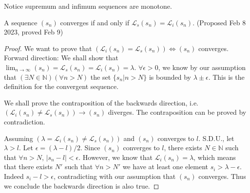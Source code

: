 \documentclass[../note.tex]{subfiles}
\begin{document}
\begin{remark}
	Notice supremum and infimum sequences are monotone.
\end{remark}

\begin{theorem} \label{analysis:th:Convergence_and_limit_of_sup_in}
	A sequence $(s_n)$ converges if and only if $\mathcal{L}_s (s_n) = \mathcal{L}_i(s_n)$. 
	(Proposed Feb 8 2023, proved Feb 9)
\end{theorem}

\begin{proof}
We want to prove that $(\mathcal{L}_i (s_n) = \mathcal{L}_s (s_n)) \iff (s_n)$ converges. \\
Forward direction: We shall show that $\lim_{n\to \infty}(s_n)=\mathcal{L}_s(s_n) = \mathcal{L}_i (s_n) = \lambda$. $\forall \epsilon >0$, we know by our assumption that $(\exists N \in \mathbb{N})(\forall n>N)$ the set $\{s_n|n>N\}$ is bounded by $\lambda \pm \epsilon.$ This is the definition for the convergent sequence. 

We shall prove the contraposition of the backwards direction, i.e. $ (\mathcal{L}_i (s_n) \neq \mathcal{L}_s (s_n)) \rightarrow (s_n)$ diverges.
The contraposition can be proved by contradiction. 

Assuming $ (\lambda = \mathcal{L}_i (s_n) \neq \mathcal{L}_s (s_n))$ and $ (s_n)$ converges to $l$. S.D.U., let $\lambda > l$. 
Let $\epsilon = (\lambda - l)/2$. 
Since $(s_n)$ converges to $l$, there exists $N \in \mathbb{N}$ such that $\forall n>N$, $|s_n - l| < \epsilon$. 
However, we know that $\mathcal{L}_i (s_n) = \lambda$, which means that there exists $N'$ such that $\forall n>N'$ we have at least one element $s_i > \lambda - \epsilon$. Indeed $s_i - l>\epsilon$, contradicting with our assumption that $(s_n)$ converges. Thus we conclude the backwards direction is also true.
\end{proof}


\end{document}
